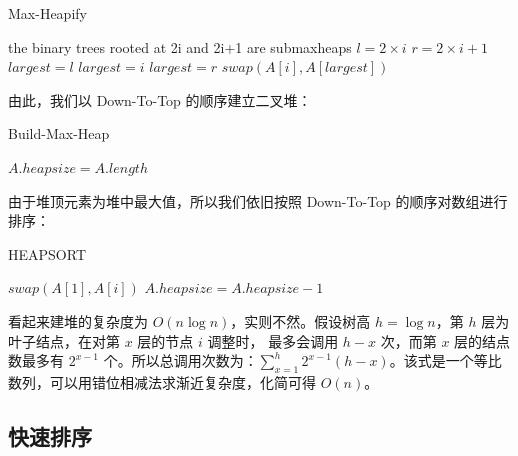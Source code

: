 \documentclass[12pt,a4paper]{article}
\begin{document}
\begin{algorithm}[h]
    \caption{Max-Heapify}
    \begin{algorithmic}[1]
        \Require
        the binary trees rooted at 2i and 2i+1 are submaxheaps
        \State $l = 2\times i$
        \State $r = 2\times i+1$
        \State $largest = l$
        \Else
        \State $largest = i$
        \EndIf
        \State $largest = r$
        \EndIf
        \State $swap(A[i], A[largest])$
        \State {}
        \EndIf
        \EndFunction
    \end{algorithmic}
\end{algorithm}

由此，我们以 Down-To-Top 的顺序建立二叉堆：
\begin{algorithm}[h]
    \caption{Build-Max-Heap}
    \begin{algorithmic}[1]
        \State $A.heapsize = A.length$
        \State {}
        \EndFor
        \EndFunction
    \end{algorithmic}
\end{algorithm}

由于堆顶元素为堆中最大值，所以我们依旧按照 Down-To-Top 的顺序对数组进行排序：

\begin{algorithm}[h]
    \caption{HEAPSORT}
    \begin{algorithmic}[1]
        \State {}
        \State $swap(A[1], A[i])$
        \State $A.heapsize = A.heapsize - 1$
        \State {}
        \EndFor
        \EndFunction
    \end{algorithmic}
\end{algorithm}

看起来建堆的复杂度为 $O(n\log n)$，实则不然。假设树高 $h = \log n$，第 $h$ 层为叶子结点，在对第 $x$ 层的节点 $i$ 调整时， 最多会调用 $h - x$ 次，而第 $x$ 层的结点数最多有 $2^{x-1}$ 个。所以总调用次数为：$\sum_{x = 1}^{h} 2^{x-1} (h-x)$。该式是一个等比数列，可以用错位相减法求渐近复杂度，化简可得 $O(n)$。

\subsection{快速排序}
\end{document}
